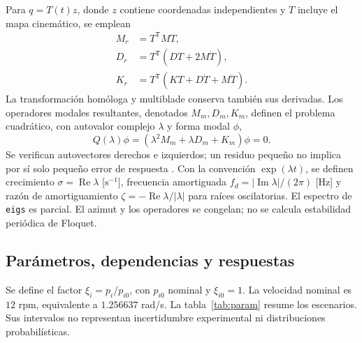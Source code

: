 \documentclass[11pt,a4paper]{article}
\begin{document}
Para $q=T(t)z$, donde $z$ contiene coordenadas independientes y $T$ incluye el mapa cinemático, se emplean
\begin{align}
M_r&=T^{\mathsf T}MT,\\
D_r&=T^{\mathsf T}(DT+2M\dot T),\\
K_r&=T^{\mathsf T}(KT+D\dot T+M\ddot T).
\end{align}
La transformación homóloga y multiblade conserva también sus derivadas. Los operadores modales resultantes, denotados $M_m,D_m,K_m$, definen el problema cuadrático, con autovalor complejo $\lambda$ y forma modal $\phi$,
\begin{equation}
Q(\lambda)\phi=(\lambda^2M_m+\lambda D_m+K_m)\phi=0.
\end{equation}
Se verifican autovectores derechos e izquierdos; un residuo pequeño no implica por sí solo pequeño error de respuesta \cite{tisseur2001}. Con la convención $\exp(\lambda t)$, se definen crecimiento $\sigma=\operatorname{Re}\lambda$ [$\mathrm{s}^{-1}$], frecuencia amortiguada $f_d=|\operatorname{Im}\lambda|/(2\pi)$ [Hz] y razón de amortiguamiento $\zeta=-\operatorname{Re}\lambda/|\lambda|$ para raíces oscilatorias. El espectro de \texttt{eigs} es parcial. El azimut y los operadores se congelan; no se calcula estabilidad periódica de Floquet.

\subsection{Parámetros, dependencias y respuestas}
Se define el factor $\xi_i=p_i/p_{i0}$, con $p_{i0}$ nominal y $\xi_{i0}=1$. La velocidad nominal es $12$ rpm, equivalente a $1.256637$ rad/s. La tabla~\ref{tab:param} resume los escenarios. Sus intervalos no representan incertidumbre experimental ni distribuciones probabilísticas.
\end{document}
